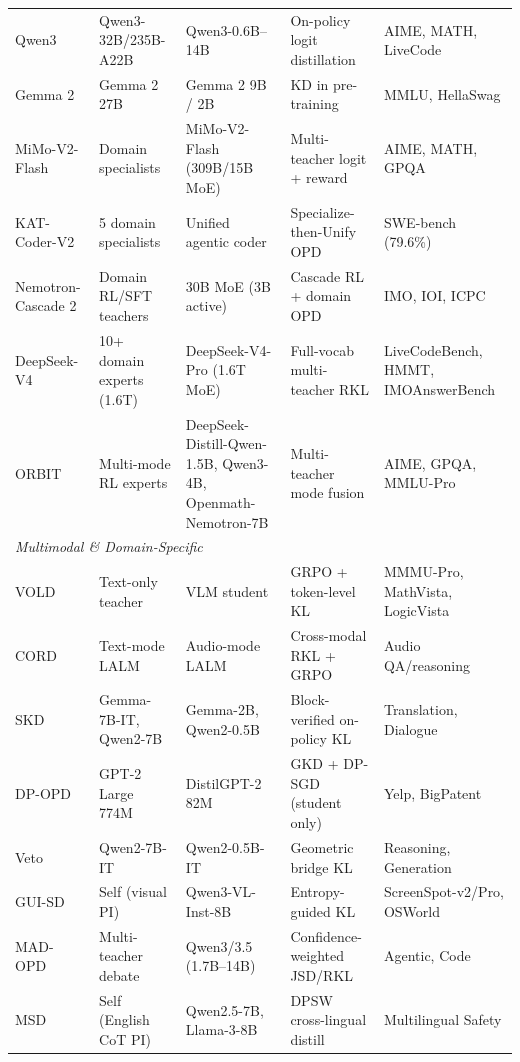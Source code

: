\documentclass{article} %
\begin{document}
\begin{table}[t]
{\begin{tabular}{@{}lllll@{}}
        Qwen3~\citep{2505.09388} & Qwen3-32B/235B-A22B & Qwen3-0.6B--14B & On-policy logit distillation & AIME, MATH, LiveCode \\
        Gemma 2~\citep{2408.00118} & Gemma 2 27B & Gemma 2 9B / 2B & KD in pre-training & MMLU, HellaSwag \\
        MiMo-V2-Flash~\citep{2601.02780} & Domain specialists & MiMo-V2-Flash (309B/15B MoE) & Multi-teacher logit + reward & AIME, MATH, GPQA \\
        KAT-Coder-V2~\citep{2603.27703} & 5 domain specialists & Unified agentic coder & Specialize-then-Unify OPD & SWE-bench (79.6\%) \\
        Nemotron-Cascade 2~\citep{2603.19220} & Domain RL/SFT teachers & 30B MoE (3B active) & Cascade RL + domain OPD & IMO, IOI, ICPC \\
        DeepSeek-V4~\citep{deepseekv4} & 10+ domain experts (1.6T) & DeepSeek-V4-Pro (1.6T MoE) & Full-vocab multi-teacher RKL & LiveCodeBench, HMMT, IMOAnswerBench \\
        ORBIT~\citep{2601.08310} & Multi-mode RL experts & DeepSeek-Distill-Qwen-1.5B, Qwen3-4B, Openmath-Nemotron-7B & Multi-teacher mode fusion & AIME, GPQA, MMLU-Pro \\
        \midrule
        \multicolumn{5}{l}{\textit{Multimodal \& Domain-Specific}} \\
        \midrule
        VOLD~\citep{2510.23497} & Text-only teacher & VLM student & GRPO + token-level KL & MMMU-Pro, MathVista, LogicVista \\
        CORD~\citep{2601.16547} & Text-mode LALM & Audio-mode LALM & Cross-modal RKL + GRPO & Audio QA/reasoning \\
        SKD~\citep{2410.11325} & Gemma-7B-IT, Qwen2-7B & Gemma-2B, Qwen2-0.5B & Block-verified on-policy KL & Translation, Dialogue \\
        DP-OPD~\citep{2604.04461} & GPT-2 Large 774M & DistilGPT-2 82M & GKD + DP-SGD (student only) & Yelp, BigPatent \\
        Veto~\citep{2601.07155} & Qwen2-7B-IT & Qwen2-0.5B-IT & Geometric bridge KL & Reasoning, Generation \\
        GUI-SD~\citep{2605.00642} & Self (visual PI) & Qwen3-VL-Inst-8B & Entropy-guided KL & ScreenSpot-v2/Pro, OSWorld \\
        MAD-OPD~\citep{2605.01347} & Multi-teacher debate & Qwen3/3.5 (1.7B--14B) & Confidence-weighted JSD/RKL & Agentic, Code \\
        MSD~\citep{2605.02971} & Self (English CoT PI) & Qwen2.5-7B, Llama-3-8B & DPSW cross-lingual distill & Multilingual Safety \\

\end{tabular}}
\end{table}
\end{document}
